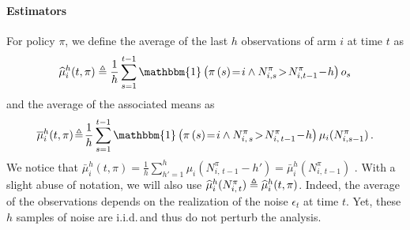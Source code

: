 \paragraph{Estimators}  
For policy $\pi$, we define the average of the last $h$ observations of arm $i$ at time $t$ as
\begin{equation}
\label{eq:def-hmu}
\widehat{\mu}_i^h(t,\pi) \triangleq \frac{1}{h}\sum_{s=1}^{t-1} \mathbbm{1}\pa{\pi\pa{s}\! =\! i \land N_{i,s}^\pi\!>\! N_{i,t-1}^\pi\! -\! h } o_{s}
\end{equation}
and the average of the associated means as
\begin{equation}
\label{eq:def-bmu}
\bar{\mu}_i^h(t,\pi) \!\triangleq\! \frac{1}{h}\sum_{s=1}^{t-1} \mathbbm{1}\pa{\pi\pa{s}\! =\! i \land N_{i,\,s}^\pi\!>\! N_{i,\,t-1}^\pi\! -\! h } \mu_{i}(N_{i,s-1}^\pi)\,.
\end{equation}
%
We notice that $\bar{\mu}_i^h(t,\pi) = \frac{1}{h}\sum_{h'=1}^{h} \mu_i(N_{i,\,t-1}^\pi-h') = \bar{\mu}_i^h(N_{i,\,t-1}^\pi)$ . With a slight abuse of notation, we will also use $\widehat{\mu}_i^h(N_{i,\,t}^\pi) \triangleq \widehat{\mu}_i^h(t,\pi)$. Indeed, the average of the observations depends on the realization of the noise $\epsilon_t$ at time $t$. Yet, these $h$ samples of noise are i.i.d.\,and thus do not perturb the analysis. 

